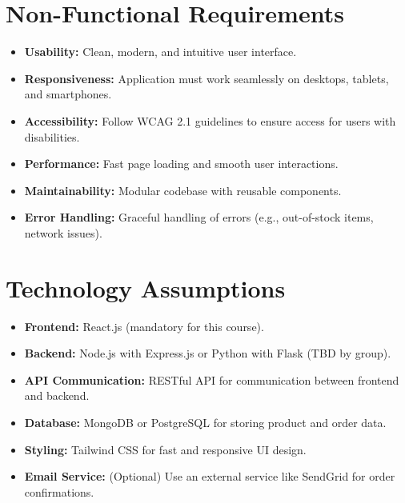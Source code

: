 \documentclass[a4paper,12pt]{article}
\begin{document}
	\section{Non-Functional Requirements}
	\begin{itemize}
		\item \textbf{Usability:} Clean, modern, and intuitive user interface.
		\item \textbf{Responsiveness:} Application must work seamlessly on desktops, tablets, and smartphones.
		\item \textbf{Accessibility:} Follow WCAG 2.1 guidelines to ensure access for users with disabilities.
		\item \textbf{Performance:} Fast page loading and smooth user interactions.
		\item \textbf{Maintainability:} Modular codebase with reusable components.
		\item \textbf{Error Handling:} Graceful handling of errors (e.g., out-of-stock items, network issues).
	\end{itemize}
	
	\section{Technology Assumptions}
	\begin{itemize}
		\item \textbf{Frontend:} React.js (mandatory for this course).
		\item \textbf{Backend:} Node.js with Express.js or Python with Flask (TBD by group).
		\item \textbf{API Communication:} RESTful API for communication between frontend and backend.
		\item \textbf{Database:} MongoDB or PostgreSQL for storing product and order data.
		\item \textbf{Styling:} Tailwind CSS for fast and responsive UI design.
		\item \textbf{Email Service:} (Optional) Use an external service like SendGrid for order confirmations.
	\end{itemize}
	
\end{document}
